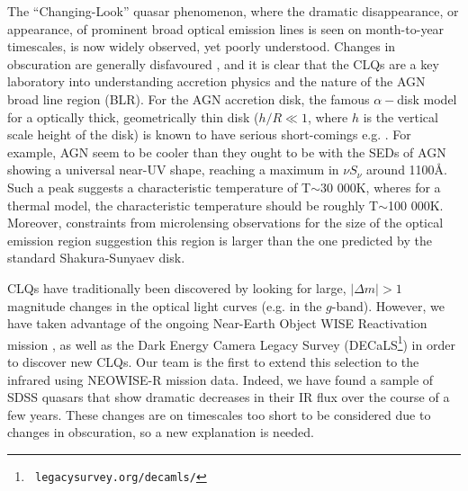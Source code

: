 \documentclass{nature}
\begin{document}

The ``Changing-Look'' quasar phenomenon, where the dramatic
disappearance, or appearance, of prominent broad optical emission
lines is seen on month-to-year timescales, is now widely observed,
\cite{LaMassa15, MacLeod16, Runnoe16, Ruan16, Gezari17, Rumbaugh17} 
yet poorly understood. Changes in obscuration are generally
disfavoured \cite{Hutsemekers17, Sheng17}, and it is clear that the
CLQs are a key laboratory into understanding accretion physics and the
nature of the AGN broad line region (BLR).
For the AGN accretion disk, the famous $\alpha-$disk model \cite{SS73}
for a optically thick, geometrically thin disk ($h / R \ll 1$, where
$h$ is the vertical scale height of the disk) is known to have serious
short-comings e.g. \cite{Antonucci99, Koratkar_Blaes99,
Lawrence12}. For example, AGN seem to be cooler than they ought to be
\cite[e.g., ][]{Lawrence12} with the SEDs of AGN showing a universal
near-UV shape, reaching a maximum in $\nu S_{\nu}$ around 1100\AA. 
Such a peak suggests a characteristic temperature of T$\sim$30 000K,
wheres for a thermal model, the characteristic temperature should be
roughly T$\sim$100 000K.  Moreover, constraints from microlensing
observations for the size of the optical emission region \cite[e.g.,
][]{Pooley07, Morgan10, Morgan12, Mosquera11} suggestion this region is
larger than the one predicted by the standard Shakura-Sunyaev disk.

CLQs have traditionally been discovered by looking for large, $|
\Delta m | >1$ magnitude changes in the optical light curves (e.g. in
the $g$-band). However, we have taken advantage of the ongoing
Near-Earth Object WISE Reactivation mission \cite[NEOWISE-R;
][]{Mainzer14, Meisner17, Meisner17b}, as well as the Dark Energy
Camera Legacy Survey (DECaLS\footnote{{\tt
legacysurvey.org/decamls/}}) in order to discover new CLQs. Our team
is the first to extend this selection to the infrared using NEOWISE-R
mission data. Indeed, we have found a sample of SDSS quasars that show
dramatic decreases in their IR flux over the course of a few
years. These changes are on timescales too short to be considered due
to changes in obscuration, so a new explanation is needed.
\end{document}
